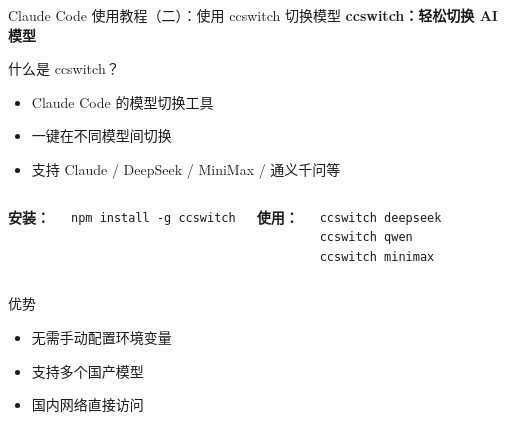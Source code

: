 \begin{frame}[fragile]{Claude Code 使用教程（二）：使用 ccswitch 切换模型}
	\textbf{ccswitch：轻松切换 AI 模型}

	\vspace{0.3cm}

	\begin{block}{什么是 ccswitch？}
		\begin{itemize}
			\item Claude Code 的模型切换工具
			\item 一键在不同模型间切换
			\item 支持 Claude / DeepSeek / MiniMax / 通义千问等
		\end{itemize}
	\end{block}

	\vspace{0.3cm}

	\begin{columns}
		\textbf{安装：}
		\begin{verbatim}
npm install -g ccswitch
		\end{verbatim}

		\textbf{使用：}
		\begin{verbatim}
ccswitch deepseek
ccswitch qwen
ccswitch minimax
		\end{verbatim}
	\end{columns}

	\vspace{0.3cm}

	\begin{block}{优势}
		\begin{itemize}
			\item 无需手动配置环境变量
			\item 支持多个国产模型
			\item 国内网络直接访问
		\end{itemize}
	\end{block}
\end{frame}

